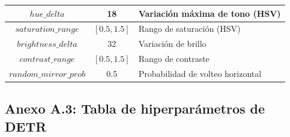 \begin{table}[H]
\begin{tabular}{|c|c|l|}
        \hline
        $hue\_delta$ & 18 & Variación máxima de tono (HSV) \\
        \hline
        $saturation\_range$ & $[0.5, 1.5]$ & Rango de saturación (HSV) \\
        \hline
        $brightness\_delta$ & 32 & Variación de brillo \\
        \hline
        $contrast\_range$ & $[0.5, 1.5]$ & Rango de contraste \\
        \hline
        $random\_mirror\_prob$ & 0.5 & Probabilidad de volteo horizontal \\
        \hline
    \end{tabular}
    \label{tab:6.1-hiperparametros-ssd}
\end{table}

\subsection*{Anexo A.3: Tabla de hiperparámetros de DETR}

